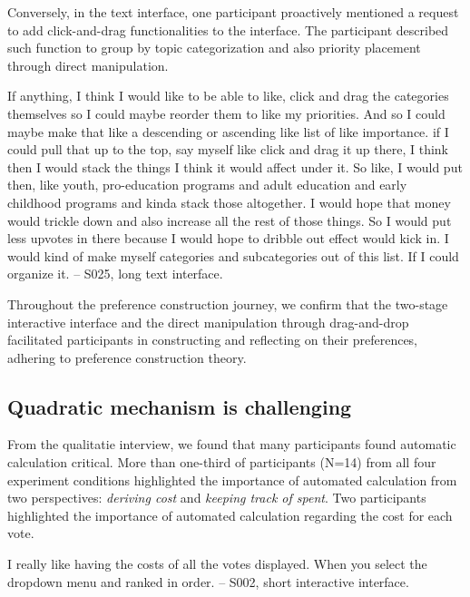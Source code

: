 Conversely, in the text interface, one participant proactively mentioned a request to add click-and-drag functionalities to the interface. The participant described such function to group by topic categorization and also priority placement through direct manipulation.

\begin{displayquote}
If anything, I think I would like to be able to like, click and drag the categories themselves so I could maybe reorder them to like my priorities. And so I could maybe make that like a descending or ascending like list of like importance. \bracketellipsis if I could pull that up to the top, say myself like click and drag it up there, I think then I would stack the things I think it would affect under it. So like, I would put then, like youth, pro-education programs and adult education and early childhood programs and kinda stack those altogether. \bracketellipsis I would hope that money would trickle down and also increase all the rest of those things. So I would put less upvotes in there because I would hope to dribble out effect would kick in. \bracketellipsis I would kind of make myself categories and subcategories out of this list. If I could organize it.
\noindent \hfill -- S025, long text interface.
\end{displayquote}

Throughout the preference construction journey, we confirm that the two-stage interactive interface and the direct manipulation through drag-and-drop facilitated participants in constructing and reflecting on their preferences, adhering to preference construction theory.


\subsection{Quadratic mechanism is challenging}
From the qualitatie interview, we found that many participants found automatic calculation critical. More than one-third of participants (N=14) from all four experiment conditions highlighted the importance of automated calculation from two perspectives: \textit{deriving cost} and \textit{keeping track of spent}. Two participants highlighted the importance of automated calculation regarding the cost for each vote.

\begin{displayquote}
I really like having the costs of all the votes displayed. When you select the dropdown menu and ranked in order.
\noindent \hfill -- S002, short interactive interface.
\end{displayquote}

